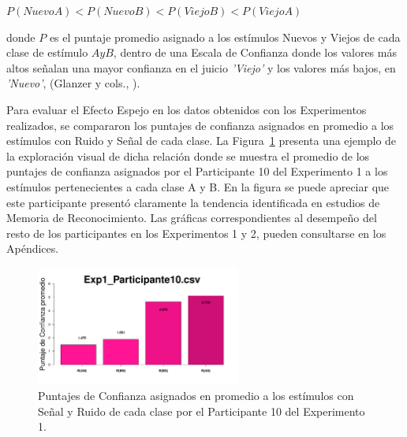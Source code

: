 \begin{center}
$P(NuevoA) < P(NuevoB) < P(ViejoB) < P(ViejoA)$\\
\end{center}
\begin{center}
donde $P$ es el puntaje promedio asignado a los estímulos Nuevos y Viejos de cada clase de estímulo $A y B$, dentro de una Escala de Confianza donde los valores más altos señalan una mayor confianza en el juicio \textit{'Viejo'} y los valores más bajos, en \textit{'Nuevo'}, (Glanzer y cols., \citeyear{Glanzer1993}).\\
\end{center}

Para evaluar el Efecto Espejo en los datos obtenidos con los Experimentos realizados, se compararon los puntajes de confianza asignados en promedio a los estímulos con Ruido y Señal de cada clase. La Figura~\ref{fig:MirrorRating_E1_P10} presenta una ejemplo de la exploración visual de dicha relación donde se muestra el promedio de los puntajes de confianza asignados por el Participante 10 del Experimento 1 a los estímulos pertenecientes a cada clase A y B. En la figura se puede apreciar que este participante presentó claramente la tendencia identificada en estudios de Memoria de Reconocimiento. Las gráficas correspondientes al desempeño del resto de los participantes en los Experimentos 1 y 2, pueden consultarse en los Apéndices.\\

\begin{figure}[th]
\centering
\includegraphics[width=0.60\textwidth]{Figures/MirrorRating_Exp1_P10}
\caption[Explorando datos individuales (ejemplo): Promedio de los puntajes de confianza registrados para cada tipo y clase de ensayo]{Puntajes de Confianza asignados en promedio a los estímulos con Señal y Ruido de cada clase por el Participante 10 del Experimento 1.}
\label{fig:MirrorRating_E1_P10}
\end{figure}

